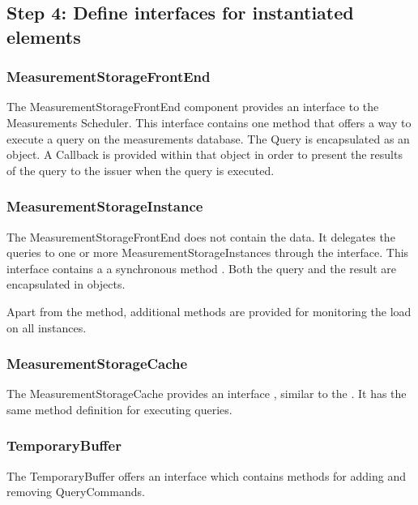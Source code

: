 \subsection{Step 4: Define interfaces for instantiated elements}
\label{add:it4/interfaces}

\subsubsection{MeasurementStorageFrontEnd}

\npar The MeasurementStorageFrontEnd component provides an interface
 to the Measurements Scheduler. This interface
contains one method  that offers a way
to execute a query on the measurements database. The Query is encapsulated as an
object. A Callback is provided within that object in order to present the
results of the query to the issuer when the query is executed.

\subsubsection{MeasurementStorageInstance}

\npar The MeasurementStorageFrontEnd does not contain the data. It delegates
the queries to one or more MeasurementStorageInstances through the
 interface. This interface contains a
a synchronous method . Both the query and the
result are encapsulated in objects.

\npar Apart from the  method, additional methods are provided
for monitoring the load on all instances.

\subsubsection{MeasurementStorageCache}

\npar The MeasurementStorageCache provides an interface
, similar to the
. It has the same method definition for
executing queries. 

\subsubsection{TemporaryBuffer}

\npar The TemporaryBuffer offers an  interface
which contains methods for adding and removing QueryCommands. 

